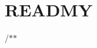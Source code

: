 \chapter{READMY }
\hypertarget{md__e_1_2tutor_2tree2_2src_2_r_e_a_d_m_y}{}\label{md__e_1_2tutor_2tree2_2src_2_r_e_a_d_m_y}
/\+\texorpdfstring{$\ast$}{*}\texorpdfstring{$\ast$}{*} 
